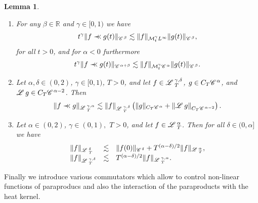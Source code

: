 \documentclass[a4paper,11pt]{article}
\newcommand{\precprec}{\prec\!\!\!\prec}
\newcommand{\tmdummy}{$\mbox{}$}
\newenvironment{enumeratealpha}{\begin{enumerate}[a{\textup{)}}] }{\end{enumerate}}
\newtheorem{lemma}[theorem]{Lemma}
{\theorembodyfont{\rmfamily}\newtheorem{remark}[theorem]{Remark}}
\newcommand{\CC}{\mathscr{C} \hspace{.1em}}
\newcommand{\LL}{\mathscr{L} \hspace{.2em}}
\begin{document}
\begin{lemma}
  {\tmdummy}
  
  \begin{enumeratealpha}
    \item For any $\beta \in \mathbb{R}$ and $\gamma \in [0, 1)$ we have
    \begin{equation}
      \label{eq:mod para-1} t^{\gamma} \|f \precprec g (t) \|_{\CC^{\beta}}
      \lesssim \|f\|_{\mathcal{M}^{\gamma}_t L^{\infty}} \|g (t)
      \|_{\CC^{\beta}},
    \end{equation}
    for all $t > 0$, and for $\alpha < 0$ furthermore
    \begin{equation}
      \label{eq:mod para-2} t^{\gamma} \|f \precprec g (t) \|_{\CC^{\alpha +
      \beta}} \lesssim \|f\|_{\mathcal{M}^{\gamma}_t \CC^{\alpha}} \|g (t)
      \|_{\CC^{\beta}} .
    \end{equation}
    \item Let $\alpha, \delta \in (0, 2)$, $\gamma \in [0, 1)$, $T > 0$, and
    let $f \in \LL_T^{\gamma, \delta}$, $g \in C_T \CC^{\alpha}$, and $\LL g
    \in C_T \CC^{\alpha - 2}$. Then
    \begin{equation}
      \| f \precprec g \|_{\LL^{\gamma, \alpha}_T} \lesssim \| f
      \|_{\LL^{\gamma, \delta}_T} \left( \| g \|_{C_T \CC^{\alpha}} + \left\|
      \LL g \right\|_{C_T \CC^{\alpha - 2}} \right) .
      \label{eq:mod-para-parabolic-est}
    \end{equation}
    \item Let $\alpha \in (0, 2)$, $\gamma \in (0, 1),$ $T > 0$, and let $f
    \in \LL^{\alpha}_T$. Then for all $\delta \in (0, \alpha]$ we have
    \begin{equation}
      \begin{array}{lll}
        \| f \|_{\LL^{\delta}_T} & \lesssim & \| f (0) \|_{\CC^{\delta}} +
        T^{(\alpha - \delta) / 2} \| f \|_{\LL^{\alpha}_T},\\
        \| f \|_{\LL^{\gamma, \delta}_T} & \lesssim & T^{(\alpha - \delta) /
        2} \| f \|_{\LL^{\gamma, \alpha}_T} .
      \end{array}
    \end{equation}
  \end{enumeratealpha}
\end{lemma}

Finally we introduce various commutators which allow to control non-linear
functions of paraproducs and also the interaction of the paraproducts with the
heat kernel.
\end{document}
